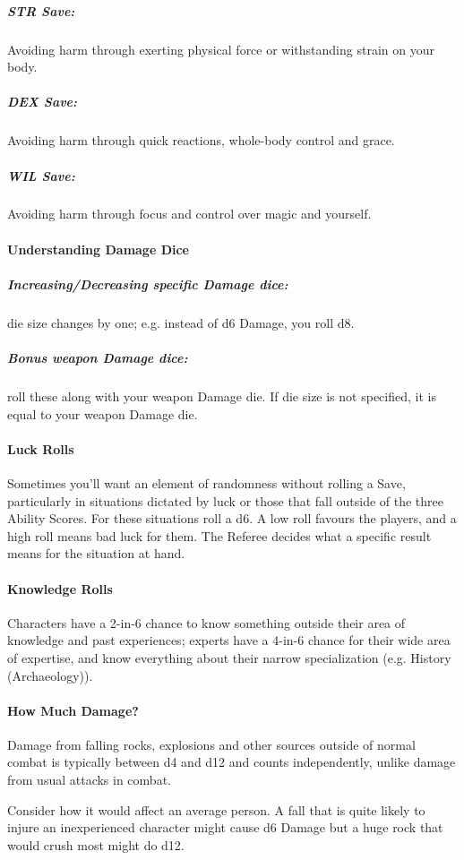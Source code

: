 \documentclass[itdr]{subfiles}
\begin{document}
\subparagraph{STR Save:} Avoiding harm through exerting physical force or withstanding strain on your body.

\subparagraph{DEX Save:} Avoiding harm through quick reactions, whole-body control and grace.

\subparagraph{WIL Save:} Avoiding harm through focus and control over magic and yourself.

\paragraph{Understanding Damage Dice}
\subparagraph{Increasing/Decreasing specific Damage dice:} die size changes by one; e.g. instead of d6 Damage, you roll d8.

\subparagraph{Bonus weapon Damage dice:} roll these along with your weapon Damage die. If die size is not specified, it is equal to your weapon Damage die.

\paragraph{Luck Rolls}
Sometimes you'll want an element of randomness without rolling a Save, particularly in situations dictated by luck or those that fall outside of the three Ability Scores. For these situations roll a d6. A low roll favours the players, and a high roll means bad luck for them. The Referee decides what a specific result means for the situation at hand.

\paragraph{Knowledge Rolls}
Characters have a 2-in-6 chance to know something outside their area of knowledge and past experiences; experts have a 4-in-6 chance for their wide area of expertise, and know everything about their narrow specialization (e.g. History (Archaeology)).

\paragraph{How Much Damage?}
Damage from falling rocks, explosions and other sources outside of normal combat is typically between d4 and d12 and counts independently, unlike damage from usual attacks in combat.

Consider how it would affect an average person. A fall that is quite likely to injure an inexperienced character might cause d6 Damage but a huge rock that would crush most might do d12.
\end{document}
